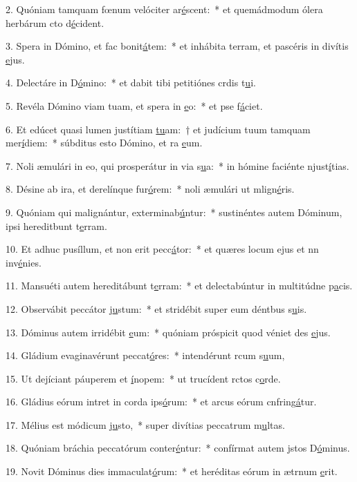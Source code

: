 2. Quóniam tamquam fœnum velóciter ar\uline{é}scent:~* et quemádmodum ólera herbárum cto d\uline{é}cident.\par 
3. Spera in Dómino, et fac bonit\uline{á}tem:~* et inhábita terram, et pascéris in divítis \uline{e}jus.\par 
4. Delectáre in D\uline{ó}mino:~* et dabit tibi petitiónes crdis t\uline{u}i.\par 
5. Revéla Dómino viam tuam, et spera in \uline{e}o:~* et pse f\uline{á}ciet.\par 
6. Et edúcet quasi lumen justítiam \uline{tu}am:~† et judícium tuum tamquam mer\uline{í}diem:~* súbditus esto Dómino, et ra \uline{e}um.\par 
7. Noli æmulári in eo, qui prosperátur in via s\uline{u}a:~* in hómine faciénte njust\uline{í}tias.\par 
8. Désine ab ira, et derelínque fur\uline{ó}rem:~* noli æmulári ut mlign\uline{é}ris.\par 
9. Quóniam qui malignántur, exterminab\uline{ú}ntur:~* sustinéntes autem Dóminum, ipsi hereditbunt t\uline{e}rram.\par 
10. Et adhuc pusíllum, et non erit pecc\uline{á}tor:~* et quæres locum ejus et nn inv\uline{é}nies.\par 
11. Mansuéti autem hereditábunt t\uline{e}rram:~* et delectabúntur in multitúdne p\uline{a}cis.\par 
12. Observábit peccátor j\uline{u}stum:~* et stridébit super eum déntbus s\uline{u}is.\par 
13. Dóminus autem irridébit \uline{e}um:~* quóniam próspicit quod véniet des \uline{e}jus.\par 
14. Gládium evaginavérunt peccat\uline{ó}res:~* intendérunt rcum s\uline{u}um,\par 
15. Ut dejíciant páuperem et \uline{í}nopem:~* ut trucídent rctos c\uline{o}rde.\par 
16. Gládius eórum intret in corda ips\uline{ó}rum:~* et arcus eórum cnfring\uline{á}tur.\par 
17. Mélius est módicum j\uline{u}sto,~* super divítias peccatrum m\uline{u}ltas.\par 
18. Quóniam bráchia peccatórum conter\uline{é}ntur:~* confírmat autem jstos D\uline{ó}minus.\par 
19. Novit Dóminus dies immaculat\uline{ó}rum:~* et heréditas eórum in ætrnum \uline{e}rit.\par 
